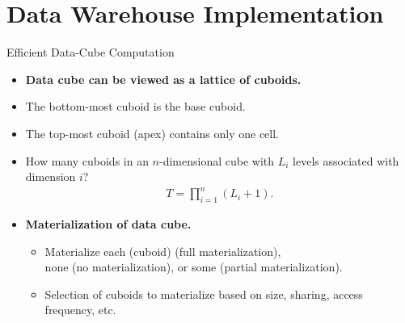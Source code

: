 \section{Data Warehouse Implementation}

\begin{frame}{Efficient Data-Cube Computation}
	\begin{itemize}
		\item \textbf{Data cube can be viewed as a lattice of cuboids.}
		\item The bottom-most cuboid is the base cuboid.
		\item The top-most cuboid (apex) contains only one cell.
		\item How many cuboids in an $n$-dimensional cube with $L_i$ levels associated with dimension $i$?
		      \begin{align}
			      T = \prod_{i=1}^{n} (L_i +1).
		      \end{align}
		\item \textbf{{\color{airforceblue}Materialization} of data cube.}
		      \begin{itemize}
			      \item Materialize each (cuboid) (full materialization), \\
			            none (no materialization), or some (partial materialization).
			      \item Selection of cuboids to materialize based on size, sharing, access frequency, etc.
		      \end{itemize}
	\end{itemize}
\end{frame}

